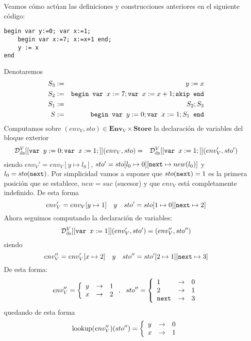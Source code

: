\begin{example} Veamos cómo actúan las definiciones y construcciones anteriores en el siguiente código:
\begin{verbatim}
begin var y:=0; var x:=1;
    begin var x:=7; x:=x+1 end;
    y := x
end
\end{verbatim}
Denotaremos
\begin{eqnarray*}
    S_3 &:=&  y := x \\
    S_2 &:=&  \texttt{begin } \texttt{var } x:=7; \texttt{var } x:=x+1; \texttt{skip} \texttt{ end} \\
    S_1 &:=&  S_2;S_3 \\
    S   &:=&  \texttt{begin } \texttt{var } y:=0; \texttt{var } x:=1; S_1 \texttt{ end} 
\end{eqnarray*}
Computamos sobre $(env_V, sto)\in \mathbf{Env}_V\times\mathbf{Store}$ la declaración de variables del bloque exterior
\begin{eqnarray*}
    \mathcal{D}_{\mathrm{ds}}^V [[\texttt{var } y:=0; \texttt{var } x:=1;]](env_V, sto) &=& \mathcal{D}_{\mathrm{ds}}^V [[\texttt{var } x:=1;]](env_V', sto')
\end{eqnarray*}
siendo $env_V' = env_V[y\mapsto l_0]$, $sto' = sto[l_0\mapsto 0][\texttt{next}\mapsto new(l_0)]$ y $l_0 = sto(\texttt{next})$. Por simplicidad vamos a suponer que $sto(\texttt{next}) = 1$ es la primera posición que se establece, $new = suc$ (sucesor) y que $env_V$ está completamente indefinido. De esta forma
$$
    env_V' = env_V[y\mapsto 1]\ \ \ y\ \ \ sto' = sto[1\mapsto 0][\texttt{next}\mapsto 2]
$$
Ahora seguimos computando la declaración de variables:
\begin{eqnarray*}
    \mathcal{D}_{\mathrm{ds}}^V [[\texttt{var } x:=1]](env_V', sto') = (env_V'', sto'')
\end{eqnarray*}
siendo
$$
    env_V'' = env_V'[x\mapsto 2]\ \ \ y\ \ \ sto'' = sto'[2\mapsto 1][\texttt{next}\mapsto 3]
$$
De esta forma:
\[
    env_V'' = \left\{\begin{array}{lcl}
         y & \to & 1 \\
         x & \to & 2
    \end{array}\right.,\ \ sto'' = \left\{\begin{array}{lcl}
         1 & \to & 0 \\
         2 & \to & 1 \\
         \texttt{next} & \to & 3
    \end{array}\right.
\]
quedando de esta forma
\[
    \mathrm{lookup}(env_V'')(sto'') = \left\{\begin{array}{lcl}
         y & \to & 0 \\
         x & \to & 1
    \end{array}\right.
\]
\end{example}
